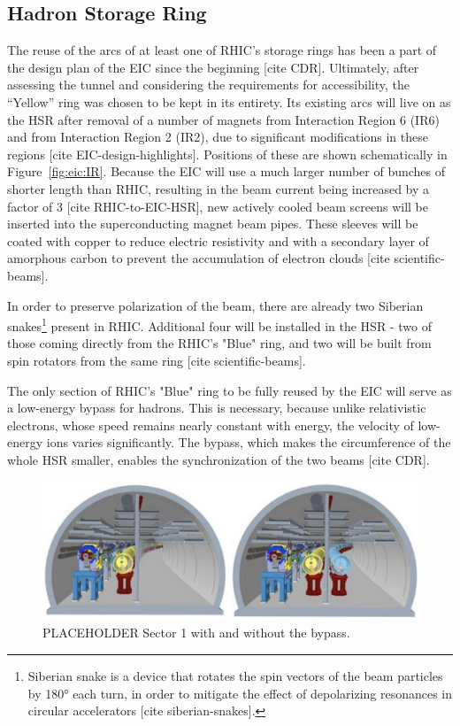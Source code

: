 \subsection{Hadron Storage Ring}
The reuse of the arcs of at least one of RHIC's storage rings has been a part of the design plan of the EIC since the beginning [cite CDR]. Ultimately, after assessing the tunnel and considering the requirements for accessibility, the “Yellow” ring was chosen to be kept in its entirety. Its existing arcs will live on as the HSR after removal of a number of magnets from Interaction Region 6 (IR6) and from Interaction Region 2 (IR2), due to significant modifications in these regions [cite EIC-design-highlights]. Positions of these are shown schematically in Figure~\ref{fig:eic:IR}. Because the EIC will use a much larger number of bunches of shorter length than RHIC, resulting in the beam current being increased by a factor of 3 [cite RHIC-to-EIC-HSR], new actively cooled beam screens will be inserted into the superconducting magnet beam pipes. These sleeves will be coated with copper to reduce electric resistivity and with a secondary layer of amorphous carbon to prevent the accumulation of electron clouds [cite scientific-beams]. 

In order to preserve polarization of the beam, there are already two Siberian snakes\footnote{Siberian snake is a device that rotates the spin vectors of the beam particles by \ang{180} each turn, in order to mitigate the effect of depolarizing resonances in circular accelerators [cite siberian-snakes].} present in RHIC. Additional four will be installed in the HSR - two of those coming directly from the RHIC's "Blue" ring, and two will be built from spin rotators from the same ring [cite scientific-beams].

The only section of RHIC's "Blue" ring to be fully reused by the EIC will serve as a low-energy bypass for hadrons. This is necessary, because unlike relativistic electrons, whose speed remains nearly constant with energy, the velocity of low-energy ions varies significantly. The bypass, which makes the circumference of the whole HSR smaller, enables the synchronization of the two beams [cite CDR].

\begin{figure}[ht]
    \centering
    \includegraphics[width=\linewidth]{img/tunnel.png}
    \caption{PLACEHOLDER Sector 1 with and without the bypass.}
    \label{fig:eic:tunnel}
\end{figure}

